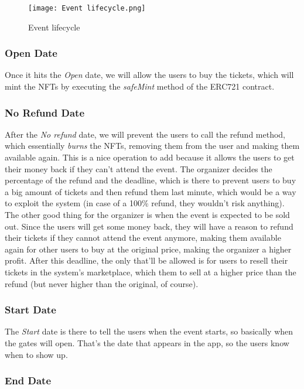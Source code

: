 \begin{figure}[H]
	\texttt{[image: Event lifecycle.png]}
	\centering
	\caption{Event lifecycle}
	\label{fig:event_lifecycle}
\end{figure}

\subsubsection{Open Date}

Once it hits the \textit{Open} date, we will allow the users to buy the
tickets, which will mint the NFTs by executing the \textit{safeMint} method of
the ERC721 contract.

\subsubsection{No Refund Date}

After the \textit{No refund} date, we will prevent the users to call the refund
method, which essentially \textit{burns} the NFTs, removing them from the user
and making them available again. This is a nice operation to add because it
allows the users to get their money back if they can't attend the event. The
organizer decides the percentage of the refund and the deadline, which is there
to prevent users to buy a big amount of tickets and then refund them last
minute, which would be a way to exploit the system (in case of a 100\% refund,
they wouldn't risk anything). The other good thing for the organizer is when
the event is expected to be sold out. Since the users will get some money back,
they will have a reason to refund their tickets if they cannot attend the event
anymore, making them available again for other users to buy at the original
price, making the organizer a higher profit. After this deadline, the only
that'll be allowed is for users to resell their tickets in the system's
marketplace, which them to sell at a higher price than the refund (but never
higher than the original, of course).

\subsubsection{Start Date}

The \textit{Start} date is there to tell the users when the event starts, so
basically when the gates will open. That's the date that appears in the app, so
the users know when to show up.

\subsubsection{End Date}

